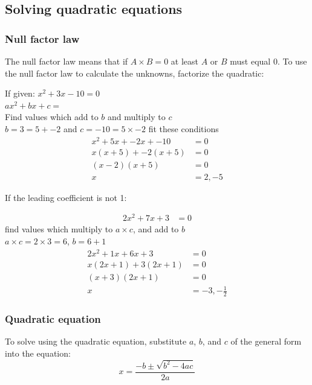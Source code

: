 \documentclass[a4paper,10pt]{report}
\begin{document}
\subsection{Solving quadratic equations}
\subsubsection{Null factor law}
The null factor law means that if $A \times B = 0$ at least $A$ or $B$ must equal 0.
To use the null factor law to calculate the unknowns, factorize the quadratic:
\begin{center}
	If given: $x^2 + 3x - 10 = 0$\\
	$ax^2 + bx + c = $\\
	Find values which add to $b$ and multiply to $c$\\
	$b = 3 = 5 + -2$ and $c = -10 = 5 \times -2$ fit these conditions
	\begin{align*}
		x^2 + 5x + -2x + -10 & = 0     \\
		x(x + 5) + -2(x + 5) & = 0     \\
		(x - 2)(x + 5)       & = 0     \\
		x                    & = 2, -5
	\end{align*}
\end{center}

If the leading coefficient is not 1:
\begin{center}
	\begin{align*}
		2x^2 + 7x + 3 & = 0
	\end{align*}
	find values which multiply to $a \times c$, and add to $b$\\
	$a \times c = 2 \times 3 = 6$, $b = 6 + 1$
	\begin{align*}
		2x^2 + 1x + 6x + 3    & = 0                \\
		x(2x + 1) + 3(2x + 1) & = 0                \\
		(x + 3)(2x + 1)       & = 0                \\
		x                     & = -3, -\frac{1}{2}
	\end{align*}
\end{center}

\subsubsection{Quadratic equation}
To solve using the quadratic equation, substitute $a$, $b$, and $c$ of the general form into the equation:
$$
	x = \frac{-b \pm \sqrt{b^2 - 4ac}}{2a}
$$
\end{document}
